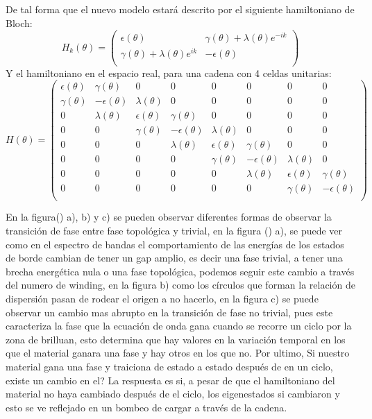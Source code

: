 De tal forma que el nuevo modelo estará descrito por el siguiente hamiltoniano de Bloch:
\begin{equation}
    H_k(\theta) =      
     \begin{pmatrix}
            \epsilon(\theta) & \gamma(\theta) + \lambda(\theta) e^{-ik}  \\
            \gamma(\theta) + \lambda(\theta) e^{ik} & -\epsilon(\theta) \\
        \end{pmatrix} 
\end{equation}
Y el hamiltoniano en el espacio real, para una cadena con 4 celdas unitarias:
\begin{equation}
    H (\theta)= 
     \begin{pmatrix}
            \epsilon(\theta) & \gamma(\theta) & 0 & 0 & 0 & 0 & 0 & 0 \\
            \gamma(\theta) & -\epsilon(\theta) & \lambda(\theta) & 0 & 0 & 0 & 0 & 0 \\
            0 & \lambda(\theta) & \epsilon(\theta) & \gamma(\theta) & 0 & 0 & 0 & 0 \\
            0 & 0 & \gamma(\theta) & -\epsilon(\theta) & \lambda(\theta) & 0 & 0 & 0 \\
            0 & 0 & 0 & \lambda(\theta) & \epsilon(\theta) & \gamma(\theta) & 0 & 0 \\
            0 & 0 & 0 & 0 & \gamma(\theta) & -\epsilon(\theta) & \lambda(\theta) & 0 \\
            0 & 0 & 0 & 0 & 0 & \lambda(\theta) & \epsilon(\theta) & \gamma(\theta) \\
            0 & 0 & 0 & 0 & 0 & 0 & \gamma(\theta) & -\epsilon(\theta) \\
            
        \end{pmatrix}
\end{equation}

En la figura() a), b) y c) se pueden observar diferentes formas de observar la transición de fase entre fase topológica y trivial, en la figura () a), se puede ver como en el espectro de bandas el comportamiento de las energías de los estados de borde cambian de tener un gap amplio, es decir una fase trivial, a tener una brecha energética nula o una fase topológica, podemos seguir este cambio a través del numero de winding, en la figura b) como los círculos que forman la relación de dispersión pasan de rodear el origen a no hacerlo, en la figura c) se puede observar un cambio mas abrupto en la transición de fase no trivial, pues este caracteriza la fase que la ecuación de onda gana cuando se recorre un ciclo por la zona de brilluan, esto determina que hay valores en la variación temporal en los que el material ganara una fase y hay otros en los que no. Por ultimo, Si nuestro material gana una fase y traiciona de estado a estado después de en un ciclo, existe un cambio en el? La respuesta es si, a pesar de que el hamiltoniano del material no haya cambiado después de el ciclo, los eigenestados si cambiaron y esto se ve reflejado en un bombeo de cargar a través de la cadena.

